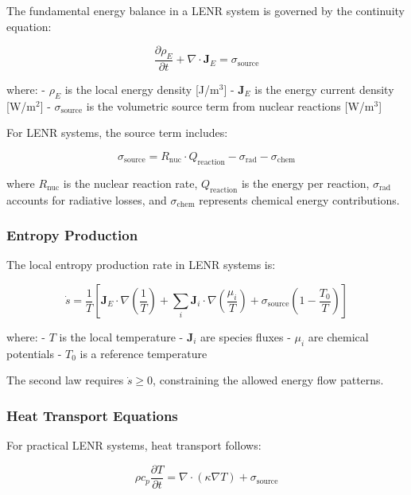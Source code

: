 \documentclass[11pt,a4paper]{article}
\begin{document}
The fundamental energy balance in a LENR system is governed by the continuity equation:

\begin{equation}
\frac{\partial \rho_E}{\partial t} + \nabla \cdot \mathbf{J}_E = \sigma_{\text{source}}
\end{equation}

where: - $\rho_E$ is the local energy density {[}J/m$^{3}${]} - $\mathbf{J}_E$ is the energy current density {[}W/m$^{2}${]} - $\sigma_{\text{source}}$ is the volumetric source term from nuclear reactions {[}W/m$^{3}${]}

For LENR systems, the source term includes:

\begin{equation}
\sigma_{\text{source}} = R_{\text{nuc}} \cdot Q_{\text{reaction}} - \sigma_{\text{rad}} - \sigma_{\text{chem}}
\end{equation}

where $R_{\text{nuc}}$ is the nuclear reaction rate, $Q_{\text{reaction}}$ is the energy per reaction, $\sigma_{\text{rad}}$ accounts for radiative losses, and $\sigma_{\text{chem}}$ represents chemical energy contributions.

\subsubsection{Entropy Production}

The local entropy production rate in LENR systems is:

\begin{equation}
\dot{s} = \frac{1}{T}\left[\mathbf{J}_E \cdot \nabla\left(\frac{1}{T}\right) + \sum_i \mathbf{J}_i \cdot \nabla\left(\frac{\mu_i}{T}\right) + \sigma_{\text{source}}\left(1 - \frac{T_0}{T}\right)\right]
\end{equation}

where: - $T$ is the local temperature - $\mathbf{J}_i$ are species fluxes - $\mu_i$ are chemical potentials - $T_0$ is a reference temperature

The second law requires $\dot{s} \geq 0$, constraining the allowed energy flow patterns.

\subsubsection{Heat Transport Equations}

For practical LENR systems, heat transport follows:

\begin{equation}
\rho c_p \frac{\partial T}{\partial t} = \nabla \cdot (\kappa \nabla T) + \sigma_{\text{source}}
\end{equation}
\end{document}
